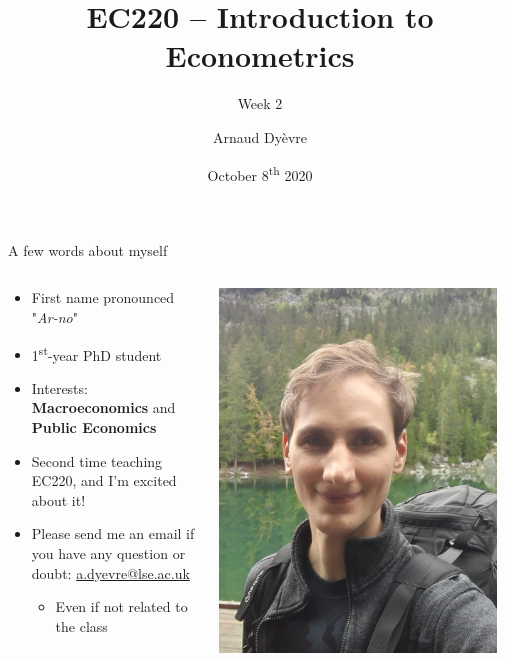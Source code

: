 \documentclass[aspectratio=169, 11pt]{beamer}
\title[]{EC220 -- Introduction to Econometrics} %
\subtitle{Week 2}
\author{Arnaud Dy\`evre} %
\institute[] %
{
}
\date{October 8\textsuperscript{th} 2020} %
\begin{document}
\begin{frame}
\titlepage %
\end{frame}




\begin{frame}{A few words about myself}

\begin{columns}[T]
    \begin{column}{.7\textwidth}
     
\begin{itemize}[<+- | alert@+>]
    \item First name pronounced "\textit{Ar-no}"
    \item 1\textsuperscript{st}-year PhD student
    \item Interests: \textbf{Macroeconomics} and \textbf{Public Economics}
    \item Second time teaching EC220, and I'm excited about it!
    \item Please send me an email if you have any question or doubt: \href{mailto:a.dyevre@lse.ac.uk}{a.dyevre@lse.ac.uk}
    \begin{itemize}
        \item Even if not related to the class
    \end{itemize}
\end{itemize}

    \end{column}
    \begin{column}{.3\textwidth}
    \includegraphics[width=0.95\textwidth]{photo_alpes.jpeg} \\
    \end{column}
  \end{columns}


\end{frame}
\end{document}
